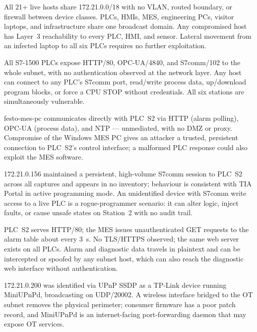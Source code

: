 \documentclass[11pt,a4paper]{article}
\begin{document}
{All 21+ live hosts share 172.21.0.0/18 with no VLAN, routed boundary, or firewall between device classes. PLCs, HMIs, MES, engineering PCs, visitor laptops, and infrastructure share one broadcast domain.}
{Any compromised host has Layer~3 reachability to every PLC, HMI, and sensor. Lateral movement from an infected laptop to all six PLCs requires no further exploitation.}

{All S7-1500 PLCs expose HTTP/80, OPC-UA/4840, and S7comm/102 to the whole subnet, with no authentication observed at the network layer.}
{Any host can connect to any PLC's S7comm port, read/write process data, up/download program blocks, or force a CPU STOP without credentials. All six stations are simultaneously vulnerable.}

{festo-mes-pc communicates directly with PLC~S2 via HTTP (alarm polling), OPC-UA (process data), and NTP --- unmediated, with no DMZ or proxy.}
{Compromise of the Windows MES PC gives an attacker a trusted, persistent connection to PLC~S2's control interface; a malformed PLC response could also exploit the MES software.}

\pagebreak
{}
{172.21.0.156 maintained a persistent, high-volume S7comm session to PLC~S2 across all captures and appears in no inventory; behaviour is consistent with TIA Portal in active programming mode.}
{An unidentified device with S7comm write access to a live PLC is a rogue-programmer scenario: it can alter logic, inject faults, or cause unsafe states on Station~2 with no audit trail.}

{PLC~S2 serves HTTP/80; the MES issues unauthenticated GET requests to the alarm table about every 3~s. No TLS/HTTPS observed; the same web server exists on all PLCs.}
{Alarm and diagnostic data travels in plaintext and can be intercepted or spoofed by any subnet host, which can also reach the diagnostic web interface without authentication.}

{172.21.0.200 was identified via UPnP SSDP as a TP-Link device running MiniUPnPd, broadcasting on UDP/20002.}
{A wireless interface bridged to the OT subnet removes the physical perimeter; consumer firmware has a poor patch record, and MiniUPnPd is an internet-facing port-forwarding daemon that may expose OT services.}
\end{document}

